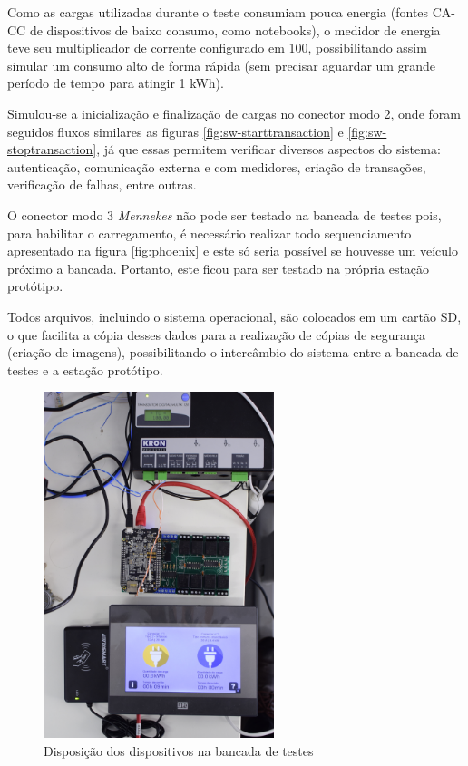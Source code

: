     Como as cargas utilizadas durante o teste consumiam pouca energia (fontes \ac{CA}-\ac{CC} de dispositivos de baixo consumo, como notebooks), o medidor de energia teve seu multiplicador de corrente configurado em 100, possibilitando assim simular um consumo alto de forma rápida (sem precisar aguardar um grande período de tempo para atingir 1 kWh).

    Simulou-se a inicialização e finalização de cargas no conector modo 2, onde foram seguidos fluxos similares as figuras \ref{fig:sw-starttransaction} e \ref{fig:sw-stoptransaction}, já que essas permitem verificar diversos aspectos do sistema: autenticação, comunicação externa e com medidores, criação de transações, verificação de falhas, entre outras.

    O conector modo 3 \textit{Mennekes} não pode ser testado na bancada de testes pois, para habilitar o carregamento, é necessário realizar todo sequenciamento apresentado na figura \ref{fig:phoenix} e este só seria possível se houvesse um veículo próximo a bancada. Portanto, este ficou para ser testado na própria estação protótipo.

    Todos arquivos, incluindo o sistema operacional, são colocados em um cartão SD, o que facilita a cópia desses dados para a realização de cópias de segurança (criação de imagens), possibilitando o intercâmbio do sistema entre a bancada de testes e a estação protótipo.

    \begin{figure}[H]
      \begin{center}
        \includegraphics[width=0.6\textwidth,natwidth=2130,natheight=1420,angle=-90]{assets/images/setup-tests.jpg}
        \caption{Disposição dos dispositivos na bancada de testes}
        \label{fig:setup-tests}
      \end{center}
    \end{figure}

